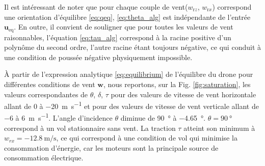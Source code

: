     Il est intéressant de noter que pour chaque couple de vent($w_{\text{r}z}$, $w_{\text{r}x}$) correspond une orientation d'équilibre \eqref{eq:qeq}, \eqref{eq:theta_alg} est indépendante de l'entrée $\boldsymbol{u}_{\text{eq}}$. En outre, il convient de souligner que pour toutes les valeurs de vent raisonnables, l'équation \eqref{eq:tau_alg} correspond à la racine positive d'un polynôme du second ordre, l'autre racine étant toujours négative, ce qui conduit à une condition de poussée négative physiquement impossible.


    À partir de l'expression analytique \eqref{eq:equilibrium} de l'équilibre du drone pour différentes conditions de vent $\boldsymbol{w}$, nous reportons, sur la Fig. \ref{fig:saturation}, les valeurs correspondantes de $\theta$, $\delta$, $\tau$ pour des valeurs de vitesse de vent horizontale allant de 0 à \SI{-20}{\meter\per\second} et pour des valeurs de vitesse de vent verticale allant de \SI{-6}{} à \SI{6}{\meter\per\second}. L'angle d'incidence $\theta$ diminue de \SI{90}{\degree} à \SI{-4.65}{\degree}. $\theta = \SI{90}{\degree}$ correspond à un vol stationnaire sans vent. La traction $\tau$ atteint son minimum à $w_{rx} = \SI{-12.8}{\meter\per\second}$, ce qui correspond à une condition de vol qui minimise la consommation d'énergie, car les moteurs sont la principale source de consommation électrique.
        
